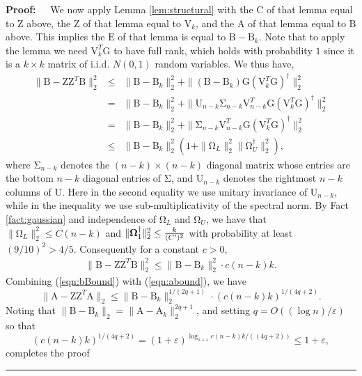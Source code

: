 \documentclass[11pt]{article}
\newenvironment{proof}{\begin{trivlist} \item {\bf Proof:~~}}
  {\qed\end{trivlist}}
\newcommand{\mat}[1]{{\ensuremath{\bm{\mathrm{#1}}}}}
\def\matA{\mat{A}}
\def\matB{\mat{B}}
\def\matC{\mat{C}}
\def\matE{\mat{E}}
\def\matG{\mat{G}}
\def\matU{\mat{U}}
\def\matV{\mat{V}}
\def\matZ{\mat{Z}}
\def\frac#1#2{{#1\over #2}}
\def\qed{\hfill\rule{2mm}{2mm}}
\newcommand{\eps}{\varepsilon}
\begin{document}
\begin{proof}
We now apply Lemma \ref{lem:structural} with the $\matC$ of that lemma equal to $\matZ$ above, the $\matZ$ of that
lemma equal to $\matV_k$, and the $\matA$ of that lemma equal to $\matB$ above. This implies the $\matE$ of that
lemma is equal to $\matB-\matB_k$. Note that to apply the lemma we need $\matV_k^T \matG$ to have full rank, which holds with probability
$1$ since it is a $k \times k$ matrix of i.i.d. $N(0,1)$ random variables. We thus have, 
\begin{eqnarray*}
\|\matB-\matZ\matZ^T\matB\|_2^2 & \leq & \|\matB-\matB_k\|_2^2 + \|(\matB-\matB_k)\matG(\matV_k^T\matG)^{\dagger}\|_2^2\\
& = & \|\matB-\matB_k\|_2^2 + \|\matU_{n-k} \mat\Sigma_{n-k}\matV_{n-k}^T \matG (\matV_k^T\matG)^{\dagger}\|_2^2\\
& = & \|\matB-\matB_k\|_2^2 + \|\mat\Sigma_{n-k} \matV_{n-k}^T \matG (\matV_k^T\matG)^{\dagger}\|_2^2\\
& \leq & \|\matB-\matB_k\|_2^2 \left (1 + \|\mat\Omega_L\|_2^2 \|\mat\Omega_U^{\dagger}\|_2^2 \right ),
\end{eqnarray*}
where $\mat\Sigma_{n-k}$ denotes the $(n-k) \times (n-k)$ diagonal matrix whose entries are the bottom $n-k$ diagonal
entries of $\mat\Sigma$, and $\matU_{n-k}$ denotes the rightmost $n-k$ columns of $\matU$. Here 
in the second equality we use unitary invariance of $\matU_{n-k}$, while in the inequality we use
sub-multiplicativity of the spectral norm. By Fact \ref{fact:gaussian} and independence of $\mat\Omega_L$ and
$\mat\Omega_U$, we have that $\|\mat\Omega_L\|_2^2 \leq C(n-k)$ and $\|\mat\Omega_1^{\dagger}\|_2^2 \leq \frac{k}{(C')^2}$
with probability at least $(9/10)^2 > 4/5$. Consequently for a constant $c > 0$, 
\begin{eqnarray}\label{eqn:bBound}
\|\matB-\matZ\matZ^T\matB\|_2^2 \leq \|\matB-\matB_k\|_2^2 \cdot c(n-k)k.
\end{eqnarray}
Combining (\ref{eqn:bBound}) with (\ref{eqn:abound}), we have
$$\|\matA-\matZ\matZ^T\matA\|_2 \leq \|\matB-\matB_k\|_2^{1/(2q+1)} \cdot \left (c(n-k)k \right )^{1/(4q+2)}.$$
Noting that $\|\matB-\matB_k\|_2 = \|\matA-\matA_k\|_2^{2q+1}$, and setting $q = O((\log n)/\eps)$ so that
$$(c(n-k)k)^{1/(4q+2)} = (1+\eps)^{\log_{1+\eps} c(n-k)k/((4q+2))} \leq 1+\eps,$$ completes the proof
\end{proof}
\end{document}
